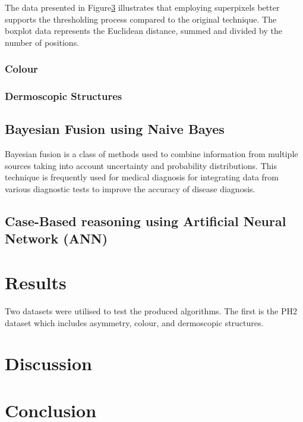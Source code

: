 The data presented in Figure\ref{} illustrates that employing superpixels better supports the thresholding process compared to the original technique. The boxplot data represents the Euclidean distance, summed and divided by the number of positions.

\subsubsection{Colour}



\subsubsection{Dermoscopic Structures}


\subsection{Bayesian Fusion using Naive Bayes}
Bayesian fusion is a class of methods used to combine information from multiple sources taking into account uncertainty and probability distributions. This technique is frequently used for medical diagnosis for integrating data from various diagnostic tests to improve the accuracy of disease diagnosis\cite{}.


\subsection{Case-Based reasoning using Artificial Neural Network (ANN)}



\section{Results}
Two datasets were utilised to test the produced algorithms. The first is the PH2 dataset which includes asymmetry, colour, and dermoscopic structures.



\section{Discussion}


\section{Conclusion}